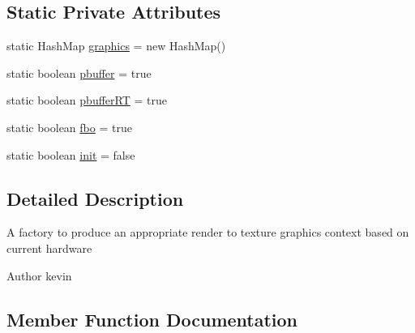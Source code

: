 \subsection*{Static Private Attributes}
\begin{DoxyCompactItemize}
\item 
static Hash\+Map \mbox{\hyperlink{classorg_1_1newdawn_1_1slick_1_1opengl_1_1pbuffer_1_1_graphics_factory_a782fd785834bb20f7159acf00db88712}{graphics}} = new Hash\+Map()
\item 
static boolean \mbox{\hyperlink{classorg_1_1newdawn_1_1slick_1_1opengl_1_1pbuffer_1_1_graphics_factory_a93aabaabb380630168faa85ed5171c54}{pbuffer}} = true
\item 
static boolean \mbox{\hyperlink{classorg_1_1newdawn_1_1slick_1_1opengl_1_1pbuffer_1_1_graphics_factory_a1e4cdc70af0c292f1277e6236a9c9478}{pbuffer\+RT}} = true
\item 
static boolean \mbox{\hyperlink{classorg_1_1newdawn_1_1slick_1_1opengl_1_1pbuffer_1_1_graphics_factory_a9ff71f4ef96ff435c621dcfb206b5bd7}{fbo}} = true
\item 
static boolean \mbox{\hyperlink{classorg_1_1newdawn_1_1slick_1_1opengl_1_1pbuffer_1_1_graphics_factory_a5eea4e175ff5f0b28ffdedb5d18ba614}{init}} = false
\end{DoxyCompactItemize}


\subsection{Detailed Description}
A factory to produce an appropriate render to texture graphics context based on current hardware

\begin{DoxyAuthor}{Author}
kevin 
\end{DoxyAuthor}


\subsection{Member Function Documentation}
\mbox{\label{classorg_1_1newdawn_1_1slick_1_1opengl_1_1pbuffer_1_1_graphics_factory_a1723770d9690868f06dbac9f7742eef9}} 
